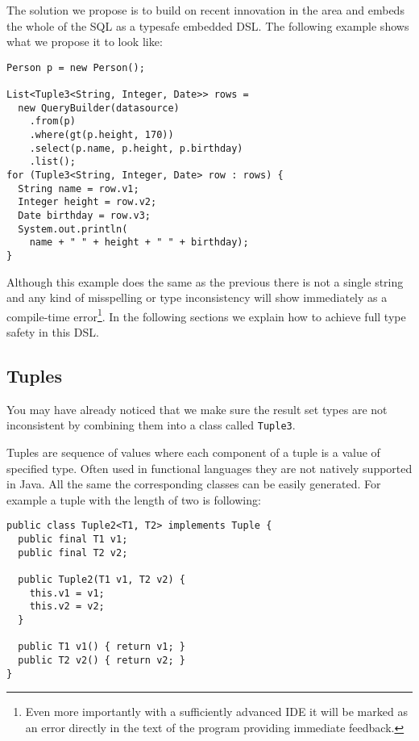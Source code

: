 \documentclass{sig-alternate}
\begin{document}
The solution we propose is to build on recent innovation in the area and embeds the whole of the SQL as a typesafe embedded DSL. The following example shows what we propose it to look like:

\begin{verbatim}
Person p = new Person(); 

List<Tuple3<String, Integer, Date>> rows =
  new QueryBuilder(datasource)
    .from(p)
    .where(gt(p.height, 170))
    .select(p.name, p.height, p.birthday)
    .list();
for (Tuple3<String, Integer, Date> row : rows) {
  String name = row.v1;
  Integer height = row.v2;
  Date birthday = row.v3;
  System.out.println(
    name + " " + height + " " + birthday);
}
\end{verbatim}

Although this example does the same as the previous there is not a single string and any kind of misspelling or type inconsistency will show immediately as a compile-time error\footnote{Even more importantly with a sufficiently advanced IDE it will be marked as an error directly in the text of the program providing immediate feedback.}. In the following sections we explain how to achieve full type safety in this DSL.

\subsection{Tuples}

You may have already noticed that we make sure the result set types are not inconsistent by combining them into a class called \verb!Tuple3!.

Tuples are sequence of values where each component of a tuple is a value of specified type. Often used in functional languages they are not natively supported in Java. All the same the corresponding classes can be easily generated. For example a tuple with the length of two is following:

\begin{verbatim}
public class Tuple2<T1, T2> implements Tuple {
  public final T1 v1;
  public final T2 v2;

  public Tuple2(T1 v1, T2 v2) {
    this.v1 = v1;
    this.v2 = v2;
  }		

  public T1 v1() { return v1; }
  public T2 v2() { return v2; }
}
\end{verbatim}
\end{document}
